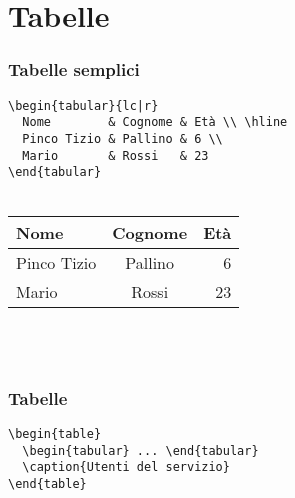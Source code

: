 \section{Tabelle}
\begin{frame}[fragile]\transfade\centering
  \frametitle{Tabelle semplici}
\verb!\begin{tabular}{lc|r}                   !\\
\verb!  Nome        & Cognome & Età \\ \hline !\\
\verb!  Pinco Tizio & Pallino & 6 \\          !\\
\verb!  Mario       & Rossi   & 23            !\\
\verb!\end{tabular}                           !\\~\\
  \begin{tabular}{lc|r}
    Nome & Cognome & Età \\ \hline
    Pinco Tizio & Pallino & 6 \\
    Mario & Rossi & 23
  \end{tabular}\\~
\end{frame}
\begin{frame}[fragile]\transfade\centering
  \frametitle{Tabelle}
\verb!\begin{table}                       !\\
\verb!  \begin{tabular} ... \end{tabular} !\\
\verb!  \caption{Utenti del servizio}     !\\
\verb!\end{table}                         !\\
  ~\\
\end{frame}